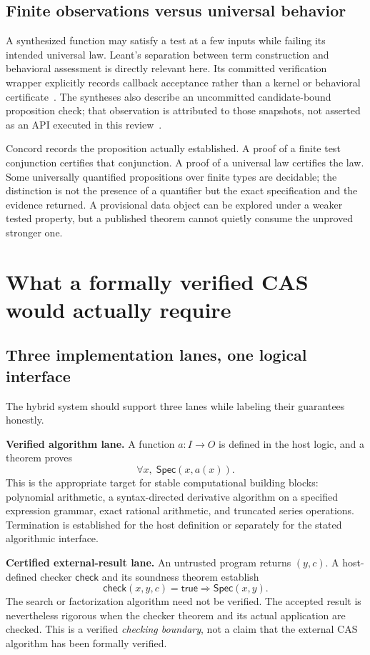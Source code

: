 \documentclass[11pt,a4paper]{article}
\newcommand{\Spec}{\mathsf{Spec}}
\theoremstyle{remark}
\begin{document}
\subsection{Finite observations versus universal behavior}
A synthesized function may satisfy a test at a few inputs while failing its
intended universal law. Leant's separation between term construction and
behavioral assessment is directly relevant here. Its committed verification
wrapper explicitly records callback acceptance rather than a kernel or behavioral
certificate~\cite{lverify}. The syntheses also describe an uncommitted
candidate-bound proposition check; that observation is attributed to those
snapshots, not asserted as an API executed in this review~\cite{synA,synB}.

Concord records the proposition actually established. A proof of a finite test
conjunction certifies that conjunction. A proof of a universal law certifies the
law. Some universally quantified propositions over finite types are decidable;
the distinction is not the presence of a quantifier but the exact specification
and the evidence returned. A provisional data object can be explored under a
weaker tested property, but a published theorem cannot quietly consume the
unproved stronger one.

\section{What a formally verified CAS would actually require}
\label{sec:cas}
\subsection{Three implementation lanes, one logical interface}
The hybrid system should support three lanes while labeling their guarantees
honestly.

\textbf{Verified algorithm lane.} A function $a:I\to O$ is defined in the host
logic, and a theorem proves
\[
 \forall x,\;\Spec(x,a(x)).
\]
This is the appropriate target for stable computational building blocks:
polynomial arithmetic, a syntax-directed derivative algorithm on a specified
expression grammar, exact rational arithmetic, and truncated series operations.
Termination is established for the host definition or separately for the stated
algorithmic interface.

\textbf{Certified external-result lane.} An untrusted program returns $(y,c)$.
A host-defined checker $\mathsf{check}$ and its soundness theorem establish
\[
 \mathsf{check}(x,y,c)=\mathsf{true}\Longrightarrow\Spec(x,y).
\]
The search or factorization algorithm need not be verified. The accepted result
is nevertheless rigorous when the checker theorem and its actual application
are checked. This is a verified \emph{checking boundary}, not a claim that the
external CAS algorithm has been formally verified.
\end{document}
